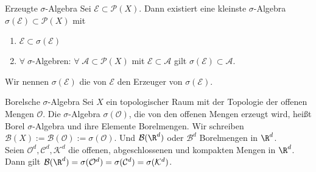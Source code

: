 \begin{karte}{Erzeugte \(\sigma\)-Algebra}
	Sei \( \mathcal{E} \subset \mathcal{P}(X) \). Dann existiert eine kleinste \(\sigma\)-Algebra \( \sigma(\mathcal{E}) \subset \mathcal{P}(X) \) mit 
	\begin{enumerate}
		\item \(\mathcal{E} \subset \sigma(\mathcal{E})\)
		\item \(\forall\; \sigma\)-Algebren: \(\forall \; \mathcal{A} \subset \mathcal{P}(X) \) mit \( \mathcal{E} \subset \mathcal{A} \) gilt \(\sigma(\mathcal{E}) \subset \mathcal{A}\).
	\end{enumerate}
	Wir nennen \(\sigma(\mathcal{E})\) die von \(\mathcal{E}\) den Erzeuger von \(\sigma(\mathcal{E})\).
\end{karte}

\begin{karte}{Borelsche \(\sigma\)-Algebra}
	Sei \(X\) ein topologischer Raum mit der Topologie der offenen Mengen \(\mathcal{O}\). 
	Die \(\sigma\)-Algebra \(\sigma(\mathcal{O})\), 
	die von den offenen Mengen erzeugt wird, heißt Borel \(\sigma\)-Algebra und ihre Elemente Borelmengen. 
	Wir schreiben \(\mathcal{B}(X) := \mathcal{B}(\mathcal{O}) := \sigma(\mathcal{O})\). 
	Und \(\mathcal{B}(\R^d)\) oder \(\mathcal{B}^d\) 
	Borelmengen in \(\R^d\).\\
	Seien \( \mathcal{O}^d, \mathcal{C}^d, \mathcal{K}^d \) die offenen, abgeschlossenen und kompakten Mengen in \(\R^d\). 
	Dann gilt \( \mathcal{B}(\R^d) = \sigma(\mathcal{O}^d) = \sigma(\mathcal{C}^d) = \sigma(\mathcal{K}^d) \).
\end{karte}